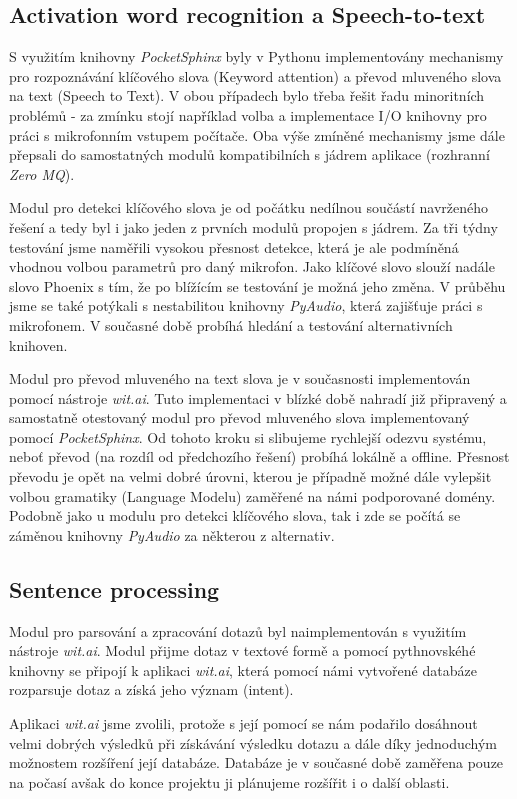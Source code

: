 \documentclass[12pt,a4paper]{article}
\begin{document}
\subsection*{Activation word recognition a Speech-to-text}
S využitím knihovny \textit{PocketSphinx} byly v Pythonu implementovány mechanismy pro rozpoznávání klíčového slova (Keyword attention) a převod mluveného slova na text (Speech to Text). V obou případech bylo třeba řešit řadu minoritních problémů - za zmínku stojí například volba a implementace I/O knihovny pro práci s mikrofonním vstupem počítače. Oba výše zmíněné mechanismy jsme dále přepsali do samostatných modulů kompatibilních s jádrem aplikace (rozhranní \textit{Zero MQ}).

Modul pro detekci klíčového slova je od počátku nedílnou součástí navrženého řešení a tedy byl i jako jeden z prvních modulů propojen s jádrem. Za tři týdny testování jsme naměřili vysokou přesnost detekce, která je ale podmíněná vhodnou volbou parametrů pro daný mikrofon. Jako klíčové slovo slouží nadále slovo Phoenix s tím, že po blížícím se testování je možná jeho změna. V průběhu jsme se také potýkali s nestabilitou knihovny \textit{PyAudio}, která zajišťuje práci s mikrofonem. V současné době probíhá hledání a testování alternativních knihoven.


Modul pro převod mluveného na text slova je v současnosti implementován pomocí nástroje \textit{wit.ai}. Tuto implementaci v blízké době nahradí již připravený a samostatně otestovaný modul pro převod mluveného slova implementovaný pomocí \textit{PocketSphinx}. Od tohoto kroku si slibujeme rychlejší odezvu systému, neboť převod (na rozdíl od předchozího řešení) probíhá lokálně a offline. Přesnost převodu je opět na velmi dobré úrovni, kterou je případně možné dále vylepšit volbou gramatiky (Language Modelu) zaměřené na námi podporované domény. Podobně jako u modulu pro detekci klíčového slova, tak i zde se počítá se záměnou knihovny \textit{PyAudio} za některou z alternativ.
\subsection*{Sentence processing}
Modul pro parsování a zpracování dotazů byl naimplementován s využitím nástroje \textit{wit.ai}. Modul přijme dotaz v textové formě a pomocí pythnovskéhé knihovny se připojí k aplikaci \textit{wit.ai}, která pomocí námi vytvořené databáze rozparsuje dotaz a získá jeho význam (intent). 

Aplikaci \textit{wit.ai} jsme zvolili, protože s její pomocí se nám podařilo dosáhnout velmi dobrých výsledků při získávání výsledku dotazu a dále díky jednoduchým možnostem rozšíření její databáze. Databáze je v současné době zaměřena pouze na počasí avšak do konce projektu ji plánujeme rozšířit i o další oblasti.
\end{document}
